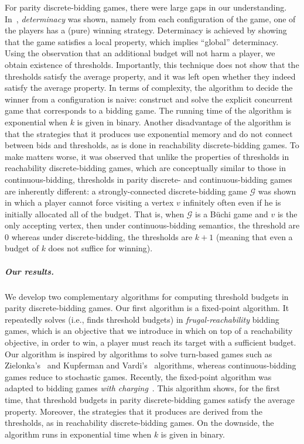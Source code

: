 \documentclass{theoretics}
\newcommand{\G}{{\mathcal G}}
\begin{document}
For parity discrete-bidding games, there were large gaps in our understanding. In~\cite{AAH21}, {\em determinacy} was shown, namely from each configuration of the game, one of the players has a (pure) winning strategy. Determinacy is achieved by showing that the game satisfies a local property, which implies ``global'' determinacy. Using the observation that an additional budget will not harm a player, we obtain existence of thresholds. Importantly, this technique does not show that the thresholds satisfy the average property, and it was left open whether they indeed satisfy the average property. In terms of complexity, the algorithm to decide the winner from a configuration is naive: construct and solve the explicit concurrent game that corresponds to a bidding game. The running time of the algorithm is exponential when $k$ is given in binary. Another disadvantage of the algorithm is that the strategies that it produces use exponential memory and do not connect between bids and thresholds, as is done in reachability discrete-bidding games. 
To make matters worse, it was observed that unlike the properties of thresholds in reachability discrete-bidding games, which are conceptually similar to those in continuous-bidding, thresholds in parity discrete- and continuous-bidding games are inherently different: a strongly-connected discrete-bidding game $\G$ was shown in which a player cannot force visiting a vertex $v$ infinitely often even if he is initially allocated all of the budget. That is, when $\G$ is a B\"uchi game and $v$ is the only accepting vertex, then under continuous-bidding semantics, the threshold are $0$ whereas under discrete-bidding, the thresholds are $k+1$ (meaning that even a budget of $k$ does not suffice for winning). 



\subparagraph*{Our results.}
We develop two complementary algorithms for computing threshold budgets in parity discrete-bidding games. 
Our first algorithm is a fixed-point algorithm. It repeatedly solves (i.e., finds threshold budgets) in {\em frugal-reachability} bidding games, which is an objective that we introduce in which on top of a reachability objective, in order to win, a player must reach its target with a sufficient budget. 
Our algorithm is inspired by algorithms to solve turn-based games such as Zielonka's~\cite{Zie98} and Kupferman and Vardi's~\cite{KV98} algorithms, whereas continuous-bidding games reduce to stochastic games. 
Recently, the fixed-point algorithm was adapted to bidding games {\em with charging}~\cite{AGHM24}.
This algorithm shows, for the first time, that threshold budgets in parity discrete-bidding games satisfy the average property. Moreover, the strategies that it produces are derived from the thresholds, as in reachability discrete-bidding games. 
On the downside, the algorithm runs in exponential time when $k$ is given in binary. 
\end{document}
